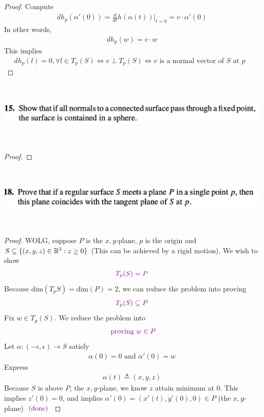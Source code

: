 \documentclass{report}
\begin{document}
\begin{proof}
Compute 
\begin{align*}
dh_p(\alpha '(0))=\frac{d}{dt}h(\alpha (t))|_{t=0}=v\cdot \alpha '(0)
\end{align*}
In other words, 
\begin{align*}
dh_p(w)=v\cdot w
\end{align*}
This implies 
\begin{align*}
dh_p(l)=0,\forall l\in T_p(S)\iff v\perp T_p(S)\iff  v\text{ is a normal vector of $S$ at $p$ }
\end{align*}
\end{proof}





\begin{question}{}{}
\includegraphics[height=3cm,width=18cm]{hw4q5}
\end{question}
\begin{proof}

\end{proof}
\begin{question}{}{}
\includegraphics[height=3cm,width=18cm]{hw4q6}
\end{question}
\begin{proof}
WOLG, suppose $P$ is the  $x,y$-plane, $p$ is the origin and $S\subseteq \{ (x,y,z)\in\mathbb{R}^3: z\geq 0 \}$ (This can be achieved by a rigid motion). We wish to show 
\begin{align*}
  \textcolor{violet}{T_p(S)=P}
\end{align*}
Because  $\text{dim}(T_pS)=\text{dim}(P)=2$, we can reduce the problem into proving 
\begin{align*}
  \textcolor{violet}{T_p(S)\subseteq P}
\end{align*}
Fix $w \in T_p(S)$. We reduce the problem into 
\begin{align*}
\textcolor{violet}{\text{ proving }w\in P}
\end{align*} 
Let $\alpha:(-\epsilon ,\epsilon )\rightarrow S$ satisfy 
\begin{align*}
\alpha (0)=0\text{ and }\alpha '(0)=w
\end{align*}
Express 
\begin{align*}
\alpha (t)\triangleq (x,y,z)
\end{align*}
Because $S$ is above $P$, the $x,y$-plane, we know  $z$ attain minimum at $0$. This implies $z'(0)=0$, and implies $\alpha '(0)=(x'(t),y'(0),0)\in P$ (the $x,y$-plane) $\textcolor{violet}{\text{ (done) }}$
\end{proof}
\end{document}
